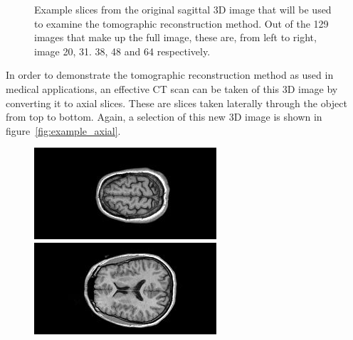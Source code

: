 \begin{figure}[ht]
\begin{minipage}[c]{0.19\linewidth}
        \end{minipage}
        \caption{Example slices from the original sagittal 3D image that will be used to examine the tomographic reconstruction method. Out of the 129 images that make up the full image, these are, from left to right, image 20, 31. 38, 48 and 64 respectively.\label{fig:example_sagittal}}
    \end{figure}

    In order to demonstrate the tomographic reconstruction method as used in medical applications, an effective CT scan can be taken of this 3D image by converting it to axial slices. These are slices taken laterally through the object from top to bottom. Again, a selection of this new 3D image is shown in figure~\ref{fig:example_axial}.
    \begin{figure}[ht]
        \centering
        \begin{minipage}[c]{0.3\linewidth}
            \centering
            \includegraphics[width=\textwidth]{Files/report_images/axial_example1.jpg}
        \end{minipage}
        \begin{minipage}[c]{0.3\linewidth}
            \centering
            \includegraphics[width=\textwidth]{Files/report_images/axial_example2.jpg}

\end{minipage}
\end{figure}
